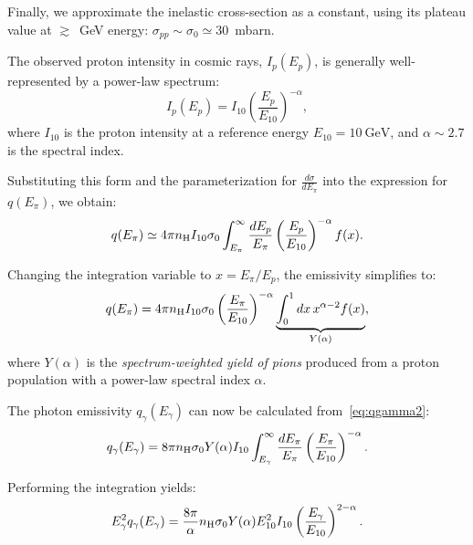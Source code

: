 Finally, we approximate the inelastic cross-section as a constant, using its plateau value at \( \gtrsim \)~GeV energy: \( \sigma_{pp} \sim \sigma_0 \simeq 30 \)~mbarn.


The observed proton intensity in cosmic rays, \(I_p(E_p)\), is generally well-represented by a power-law spectrum:
\begin{equation}
I_p(E_p) = I_{10} \left(\frac{E_p}{E_{10}}\right)^{-\alpha},
\end{equation}
where \(I_{10}\) is the proton intensity at a reference energy \(E_{10} = 10~\text{GeV}\), and \(\alpha \sim 2.7\) is the spectral index.  

Substituting this form and the parameterization for \(\frac{d\sigma}{dE_\pi}\) into the expression for \(q(E_\pi)\), we obtain:
\begin{equation}
q(E_\pi) \simeq 4 \pi n_{\rm H} I_{10} \sigma_0 \int_{E_\pi}^\infty \frac{dE_p}{E_\pi} \left(\frac{E_p}{E_{10}} \right)^{-\alpha} f(x).
\end{equation}

Changing the integration variable to \(x = E_\pi / E_p\), the emissivity simplifies to:
\begin{equation}
q(E_\pi) = 4 \pi n_{\rm H} I_{10} \sigma_0 \left(\frac{E_\pi}{E_{10}} \right)^{-\alpha} \underbrace{\int_0^1 dx \, x^{\alpha-2} f(x)}_{Y(\alpha)},
\end{equation}
where \(Y(\alpha)\) is the \emph{spectrum-weighted yield of pions} produced from a proton population with a power-law spectral index \(\alpha\).  

The photon emissivity \(q_\gamma(E_\gamma)\) can now be calculated from~\ref{eq:qgamma2}:  
\begin{equation}
q_\gamma(E_\gamma) = 8 \pi n_{\rm H} \sigma_0 Y(\alpha) I_{10} \int_{E_\gamma}^\infty \frac{dE_\pi}{E_\pi} \left(\frac{E_\pi}{E_{10}}\right)^{-\alpha}.
\end{equation}

Performing the integration yields:
\begin{equation}
E_\gamma^2 q_\gamma(E_\gamma) = \frac{8 \pi}{\alpha} n_{\rm H} \sigma_0 Y(\alpha) E_{10}^2 I_{10} \left(\frac{E_\gamma}{E_{10}}\right)^{2-\alpha}.
\end{equation}

